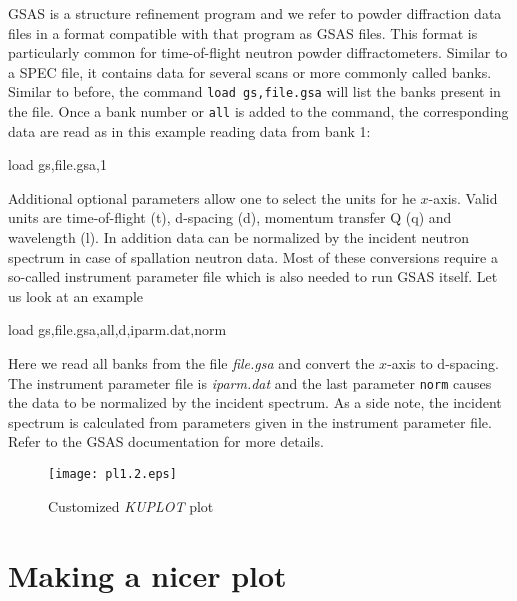 GSAS is a structure refinement program and we refer to powder
diffraction data files in a format compatible with that program as
GSAS files. This format is particularly common for time-of-flight
neutron powder diffractometers. Similar to a SPEC file, it contains
data for several scans or more commonly called banks. Similar to
before, the command {\tt load gs,file.gsa} will list the banks
present in the file. Once a bank number or {\tt all} is added to the
command, the corresponding data are read as in this example reading
data from bank 1:
%
\begin{MacVerbatim}
    load gs,file.gsa,1
\end{MacVerbatim}
%
Additional optional parameters allow one to select the units for he
$x$-axis. Valid units are time-of-flight (t), d-spacing (d),
momentum transfer Q (q) and wavelength (l). In addition data can be
normalized by the incident neutron spectrum in case of spallation
neutron data. Most of these conversions require a so-called
instrument parameter file which is also needed to run GSAS itself.
Let us look at an example
%
\begin{MacVerbatim}
    load gs,file.gsa,all,d,iparm.dat,norm
\end{MacVerbatim}
%
Here we read all banks from the file {\it file.gsa} and convert the
$x$-axis to d-spacing. The instrument parameter file is {\it
iparm.dat} and the last parameter {\tt norm} causes the data to be
normalized by the incident spectrum. As a side note, the incident
spectrum is calculated from parameters given in the instrument
parameter file. Refer to the GSAS documentation for more details.



\begin{figure}[!b]
   \centering
   \texttt{[image: pl1.2.eps]}
   \caption{Customized {\it KUPLOT} plot}
   \label{pl1-fig2}
\end{figure}

\section{Making a nicer plot \label{1d-change}}

